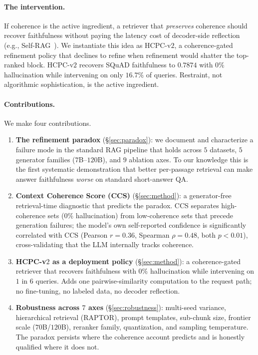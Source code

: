 \paragraph{The intervention.} If coherence is the active ingredient,
a retriever that \emph{preserves} coherence should recover faithfulness
without paying the latency cost of decoder-side reflection (e.g.,
Self-RAG~\citep{asai2024selfrag}). We instantiate this idea as
HCPC-v$2$, a coherence-gated refinement policy that declines to refine
when refinement would shatter the top-ranked block. HCPC-v$2$ recovers
SQuAD faithfulness to $0.7874$ with $0\%$ hallucination while
intervening on only $16.7\%$ of queries. Restraint, not algorithmic
sophistication, is the active ingredient.

\paragraph{Contributions.} We make four contributions.
\begin{enumerate}
  \item \textbf{The refinement paradox} (\S\ref{sec:paradox}): we
    document and characterize a failure mode in the standard RAG
    pipeline that holds across $5$ datasets, $5$ generator families
    ($7$B--$120$B), and $9$ ablation axes. To our knowledge this is
    the first systematic demonstration that better per-passage
    retrieval can make answer faithfulness \emph{worse} on standard
    short-answer QA.
  \item \textbf{Context Coherence Score (CCS)} (\S\ref{sec:method}): a
    generator-free retrieval-time diagnostic that predicts the
    paradox. CCS separates high-coherence sets ($0\%$ hallucination)
    from low-coherence sets that precede generation failures; the
    model's own self-reported confidence is significantly correlated
    with CCS (Pearson $r{=}0.36$, Spearman $\rho{=}0.48$, both $p{<}0.01$),
    cross-validating that the LLM internally tracks coherence.
  \item \textbf{HCPC-v$2$ as a deployment policy} (\S\ref{sec:method}):
    a coherence-gated retriever that recovers faithfulness with $0\%$
    hallucination while intervening on $1$ in $6$ queries. Adds one
    pairwise-similarity computation to the request path; no
    fine-tuning, no labeled data, no decoder reflection.
  \item \textbf{Robustness across $7$ axes} (\S\ref{sec:robustness}):
    multi-seed variance, hierarchical retrieval (RAPTOR), prompt
    templates, sub-chunk size, frontier scale ($70$B/$120$B), reranker
    family, quantization, and sampling temperature. The paradox
    persists where the coherence account predicts and is honestly
    qualified where it does not.
\end{enumerate}

